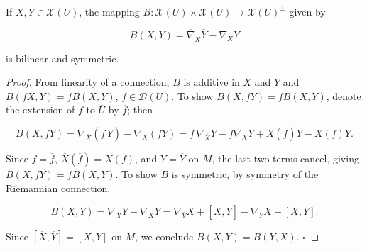 \begin{proposition}
  \label{prop:dc-ch6-2-1}
  \leanok
  If $X,Y\in\mathcal{X}(U)$, the mapping
  $B:\mathcal{X}(U)\times\mathcal{X}(U)\to\mathcal{X}(U)^\perp$ given by

  $$
  B(X,Y)=\overline{\nabla}_{\overline{X}}\overline{Y}-\nabla_X Y
  $$

  is bilinear and symmetric.
\end{proposition}
\begin{proof}
  \leanok
  From linearity of a connection, $B$ is additive in $X$ and $Y$ and
  $B(fX,Y)=fB(X,Y)$, $f\in\mathcal{D}(U)$. To show $B(X,fY)=fB(X,Y)$, denote the
  extension of $f$ to $\overline{U}$ by $\overline{f}$; then

  $$
  B(X,fY)=\overline{\nabla}_{\overline{X}}(\overline{f}\,\overline{Y})-\nabla_X(fY)=\overline{f}\,\overline{\nabla}_{\overline{X}}\overline{Y}-f\nabla_X Y+\overline{X}(\overline{f})\overline{Y}-X(f)Y.
  $$

  Since $f=\overline{f}$, $\overline{X}(\overline{f})=X(f)$, and $Y=\overline{Y}$ on
  $M$, the last two terms cancel, giving $B(X,fY)=fB(X,Y)$. To show $B$ is
  symmetric, by symmetry of the Riemannian connection,

  $$
  B(X,Y)=\overline{\nabla}_{\overline{X}}\overline{Y}-\nabla_X Y=\overline{\nabla}_{\overline{Y}}\overline{X}+[\overline{X},\overline{Y}]-\nabla_Y X-[X,Y].
  $$

  Since $[\overline{X},\overline{Y}]=[X,Y]$ on $M$, we conclude $B(X,Y)=B(Y,X)$.
  $\square$
\end{proof}

